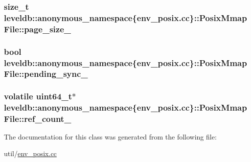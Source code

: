 \subsubsection[{page\+\_\+size\+\_\+}]{\setlength{\rightskip}{0pt plus 5cm}size\+\_\+t leveldb\+::anonymous\+\_\+namespace\{env\+\_\+posix.\+cc\}\+::Posix\+Mmap\+File\+::page\+\_\+size\+\_\+\hspace{0.3cm}{\ttfamily [private]}}\label{classleveldb_1_1anonymous__namespace_02env__posix_8cc_03_1_1_posix_mmap_file_aefb8483cd0756f3d2d350e97627992e8}
\hypertarget{classleveldb_1_1anonymous__namespace_02env__posix_8cc_03_1_1_posix_mmap_file_a7a564ab823bed15fa5670f18fac1e8ce}{}
\subsubsection[{pending\+\_\+sync\+\_\+}]{\setlength{\rightskip}{0pt plus 5cm}bool leveldb\+::anonymous\+\_\+namespace\{env\+\_\+posix.\+cc\}\+::Posix\+Mmap\+File\+::pending\+\_\+sync\+\_\+\hspace{0.3cm}{\ttfamily [private]}}\label{classleveldb_1_1anonymous__namespace_02env__posix_8cc_03_1_1_posix_mmap_file_a7a564ab823bed15fa5670f18fac1e8ce}
\hypertarget{classleveldb_1_1anonymous__namespace_02env__posix_8cc_03_1_1_posix_mmap_file_af86206974486a8b1cd2d673c0485002e}{}
\subsubsection[{ref\+\_\+count\+\_\+}]{\setlength{\rightskip}{0pt plus 5cm}volatile {\bf uint64\+\_\+t}$\ast$ leveldb\+::anonymous\+\_\+namespace\{env\+\_\+posix.\+cc\}\+::Posix\+Mmap\+File\+::ref\+\_\+count\+\_\+\hspace{0.3cm}{\ttfamily [private]}}\label{classleveldb_1_1anonymous__namespace_02env__posix_8cc_03_1_1_posix_mmap_file_af86206974486a8b1cd2d673c0485002e}


The documentation for this class was generated from the following file\+:\begin{DoxyCompactItemize}
\item 
util/\hyperlink{env__posix_8cc}{env\+\_\+posix.\+cc}\end{DoxyCompactItemize}

